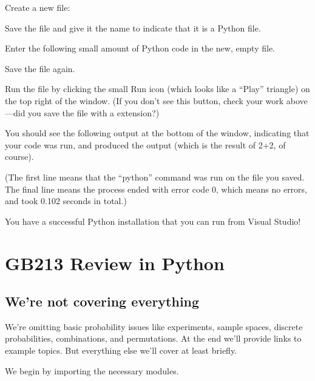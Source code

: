 \documentclass[letterpaper,10pt,english]{sphinxmanual}
\begin{document}
Create a new file:





Save the file and give it the name  to indicate that it is a Python file.



Enter the following small amount of Python code in the new, empty file.




Save the file again.

Run the file by clicking the small Run icon (which looks like a “Play”
triangle) on the top right of the window.  (If you don’t see this button,
check your work above—did you save the file with a  extension?)



You should see the following output at the bottom of the window,
indicating that your code was run, and produced the output  (which is
the result of 2+2, of course).



(The first line means that the “python” command was run on the 
file you saved. The final line means the process ended with error code
0, which means no errors, and took 0.102 seconds in total.)

You have a successful Python installation that you can run from Visual
Studio!


\chapter{GB213 Review in Python}
\label{\detokenize{GB213-review-in-Python:gb213-review-in-python}}\label{\detokenize{GB213-review-in-Python::doc}}

\section{We’re not covering everything}
\label{\detokenize{GB213-review-in-Python:we-re-not-covering-everything}}
We’re omitting basic probability issues like experiments, sample spaces, discrete probabilities, combinations, and permutations.  At the end we’ll provide links to example topics.  But everything else we’ll cover at least briefly.

We begin by importing the necessary modules.
\end{document}
